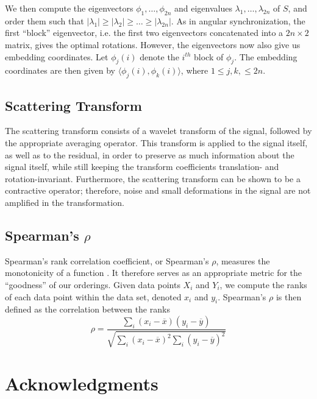 \documentclass[10pt]{article}
\begin{document}
We then compute the eigenvectors $\phi_1, \dots, \phi_{2n}$ and eigenvalues $\lambda_1, \dots, \lambda_{2n}$ of $S$, and order them such that $|\lambda_1| \ge |\lambda_2| \ge \dots \ge |\lambda_{2n}|$.
%
As in angular synchronization, the first ``block'' eigenvector, i.e. the first two eigenvectors concatenated into a $2 n \times 2$ matrix, gives the optimal rotations. 
%
However, the eigenvectors now also give us embedding coordinates.
%
Let $\phi_j(i)$ denote the $i^{th}$ block of $\phi_j$. 
%
The embedding coordinates are then given by $\langle \phi_j(i), \phi_k(i) \rangle$, where $1 \le j, k, \le 2 n$. 

\subsection*{Scattering Transform}

The scattering transform consists of a wavelet transform of the signal, followed by  the appropriate averaging operator.
%
This transform is applied to the signal itself, as well as to the residual, in order to preserve as much information about the signal itself, while still keeping the transform coefficients translation- and rotation-invariant. 
% 
Furthermore, the scattering transform can be shown to be a contractive operator; therefore, noise and small deformations in the signal are not amplified in the transformation.


\subsection*{Spearman's $\rho$}

Spearman's rank correlation coefficient, or Spearman's $\rho$, measures the monotonicity of a function \cite{...}. 
%
It therefore serves as an appropriate metric for the ``goodness'' of our orderings.
%
Given data points $X_i$ and $Y_i$, we compute the ranks of each data point within the data set, denoted $x_i$ and $y_i$.
%
Spearman's $\rho$ is then defined as the correlation between the ranks
\begin{equation}
\rho = \frac{\sum_i (x_i - \overline{x})(y_i - \overline{y})}{\sqrt{\sum_i (x_i - \overline{x})^2 \sum_i (y_i - \overline{y})^2}}
\end{equation}


\section*{Acknowledgments}
\end{document}
